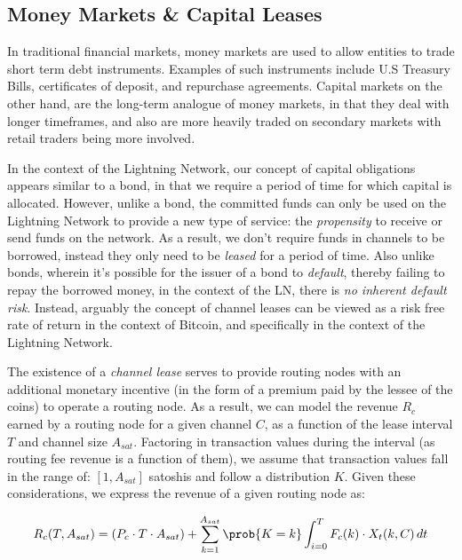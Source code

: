 \documentclass[10pt,a4paper]{article}
\theoremstyle{definition}
\begin{document}

\subsection{Money Markets \& Capital Leases} %

In traditional financial markets, money markets are used to allow entities to
trade short term debt instruments. Examples of such instruments include U.S
Treasury Bills, certificates of deposit, and repurchase agreements. Capital
markets on the other hand, are the long-term analogue of money markets, in that
they deal with longer timeframes, and also are more heavily traded on secondary
markets with retail traders being more involved.

In the context of the Lightning Network, our concept of capital obligations
appears similar to a bond, in that we require a period of time for which
capital is allocated. However, unlike a bond, the committed funds can only be
used on the Lightning Network to provide a new type of service: the
\emph{propensity} to receive or send funds on the network. As a result, we
don't require funds in channels to be borrowed, instead they only need to be
\emph{leased} for a period of time. Also unlike bonds, wherein it's possible
for the issuer of a bond to \emph{default}, thereby failing to repay the
borrowed money, in the context of the LN, there is \emph{no inherent default
risk}.  Instead, arguably the concept of channel leases can be viewed as a risk
free rate of return in the context of Bitcoin, and specifically in the context
of the Lightning Network.

The existence of a \emph{channel lease} serves to provide routing nodes with an
additional monetary incentive (in the form of a premium paid by the lessee of
the coins) to operate a routing node. As a result, we can model the revenue
$R_c$ earned by a routing node for a given channel $C$, as a function of the
lease interval $T$ and channel size $A_{sat}$. Factoring in transaction values
during the interval (as routing fee revenue is a function of them), we assume
that transaction values fall in the range of: $[1, A_{sat}]$ satoshis and
follow a distribution $K$. Given these considerations, we express the revenue
of a given routing node as:

\begin{equation}
    R_c(T, A_{sat}) = (P_c \cdot T \cdot A_{sat}) + \sum_{k=1}^{A_{sat}} \prob{K=k} \int_{i=0}^{T} F_c(k) \cdot X_{t}(k, C) \,dt 
\end{equation}
\end{document}
